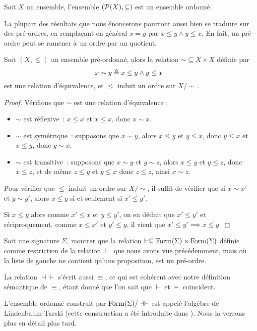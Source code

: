 \begin{example}
  Soit $X$ un ensemble, l'ensemble $(\mathcal{P}(X),\subseteq)$ est un ensemble
  ordonné.
\end{example}

La plupart des résultats que nous énoncerons pourront aussi bien se traduire sur
des pré-ordres, en remplaçant en général $x = y$ par $x\leq y \land y \leq x$.
En fait, un pré-ordre peut se ramener à un ordre par un quotient.

\begin{property}
  Soit $(X,\leq)$ un ensemble pré-ordonné, alors la relation
  $\sim\subseteq X \times X$ définie par
  \[x\sim y \triangleq x\leq y \land y \leq x\]
  est une relation d'équivalence, et $\leq$ induit un ordre sur $X/\sim$.
\end{property}

\begin{proof}
  Vérifions que $\sim$ est une relation d'équivalence :
  \begin{itemize}
  \item $\sim$ est réflexive~: $x\leq x$ et $x\leq x$, donc $x\sim x$.
  \item $\sim$ est symétrique~: supposons que $x\sim y$, alors $x\leq y$ et
    $y\leq x$, donc $y\leq x$ et $x\leq y$, donc $y\sim x$.
  \item $\sim$ est transitive~: supposons que $x\sim y$ et $y\sim z$, alors
    $x\leq y$ et $y\leq z$, donc $x\leq z$, et de même $z\leq y$ et $y\leq x$
    donc $z\leq z$, ainsi $x\sim z$.
  \end{itemize}

  Pour vérifier que $\leq$ induit un ordre sur $X/\sim$, il suffit de vérifier
  que si $x\sim x'$ et $y\sim y'$, alors $x\leq y$ si et seulement si
  $x'\leq y'$.

  Si $x\leq y$ alors comme $x'\leq x$ et $y\leq y'$, on en déduit que
  $x'\leq y'$
  et réciproquement, comme $x\leq x'$ et $y'\leq y$, il vient que
  $x'\leq y'\implies x\leq y$.
\end{proof}

\begin{exercise}
  Soit une signature $\Sigma$, montrer que la relation
  $\vdash\subseteq\operatorname{Form}(\Sigma)\times\operatorname{Form}(\Sigma)$ définie comme
  restriction de la relation $\vdash$ que nous avons vue précédemment, mais où
  la liste de gauche ne contient qu'une proposition, est un pré-ordre.
\end{exercise}

\begin{remark}
  La relation $\dashv\vdash$ s'écrit aussi $\equiv$, ce qui est cohérent avec
  notre définition sémantique de $\equiv$, étant donné que l'on sait que
  $\vdash$ et $\vDash$ coïncident.

  L'ensemble ordonné construit par $\operatorname{Form}(\Sigma)/\dashv\vdash$ est appelé
  l'algèbre de Lindenbaum-Tarski (cette construction a été introduite dans
  \cite{LindenbaumTarski}). Nous la verrons plus en détail plus tard.
\end{remark}

